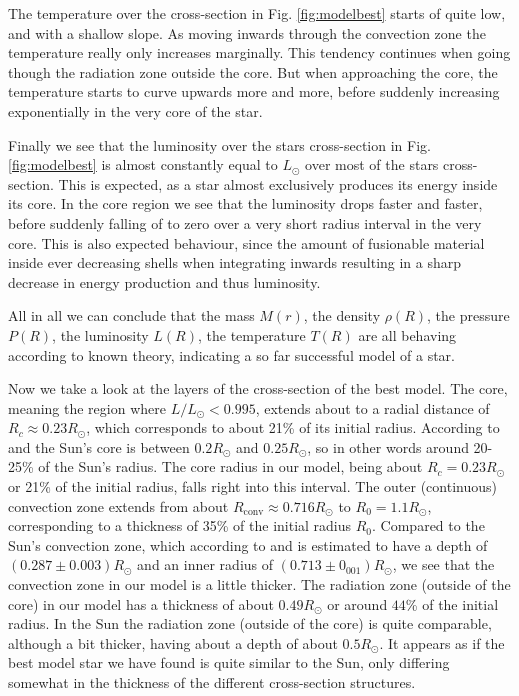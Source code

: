 \documentclass{emulateapj}
\begin{document}
	The temperature over the cross-section in Fig. \ref{fig:modelbest} starts of quite low, and with a shallow slope. As moving inwards through the convection zone the temperature really only increases marginally. This tendency continues when going though the radiation zone outside the core. But when approaching the core, the temperature starts to curve upwards more and more, before suddenly increasing exponentially in the very core of the star. 
	
	Finally we see that the luminosity over the stars cross-section in Fig. \ref{fig:modelbest} is almost constantly equal to $L_\odot$ over most of the stars cross-section. This is expected, as a star almost exclusively produces its energy inside its core. In the core region we see that the luminosity drops faster and faster, before suddenly falling of to zero over a very short radius interval in the very core. This is also expected behaviour, since the amount of fusionable material inside ever decreasing shells when integrating inwards resulting in a sharp decrease in energy production and thus luminosity.
	
	All in all we can conclude that the mass $M(r)$, the density $\rho(R)$, the pressure $P(R)$, the luminosity $L(R)$, the temperature $T(R)$ are all behaving according to known theory, indicating a so far successful model of a star.
	
	Now we take a look at the layers of the cross-section of the best model. The core, meaning the region where $L/L_\odot < 0.995$, extends about to a radial distance of $R_c \approx 0.23R_\odot$, which corresponds to about 21\% of its initial radius. According to \cite{Garcia:2007} and \cite{Davis:2016} the Sun's core is between $0.2R_\odot$ and $0.25R_\odot$, so in other words around 20-25\% of the Sun's radius. The core radius in our model, being about $R_c = 0.23R_\odot$ or 21\% of the initial radius, falls right into this interval. The outer (continuous) convection zone extends from about $R_\text{conv} \approx 0.716 R_\odot$ to $R_0 = 1.1R_\odot$, corresponding to a thickness of 35\% of the initial radius $R_0$. Compared to the Sun's convection zone, which according to \cite{Dalsgaard:1991} and \cite{Basu:1997} is estimated to have a depth of $(0.287 \pm 0.003)R_\odot$ and an inner radius of $(0.713 \pm 0_001)R_\odot$, we see that the convection zone in our model is a little thicker. The radiation zone (outside of the core) in our model has a thickness of about $0.49R_\odot$ or around $44$\% of the initial radius. In the Sun the radiation zone (outside of the core) is quite comparable, although a bit thicker, having about a depth of about $0.5R_\odot$. It appears as if the best model star we have found is quite similar to the Sun, only differing somewhat in the thickness of the different cross-section structures.
	
\end{document}
